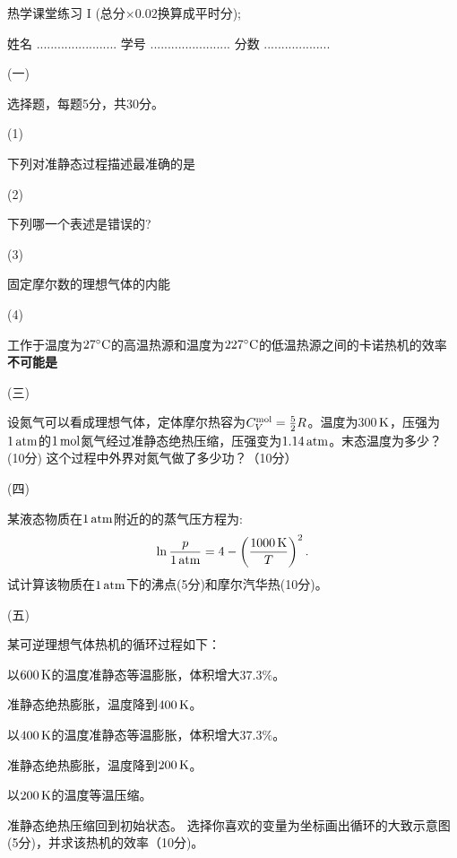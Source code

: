 \documentclass[12pt,CJK]{article}
\begin{document}
\bch
{\large 热学课堂练习 I (总分$\times 0.02$换算成平时分);}


姓名 ....................... {\hskip 0.5in}    学号 .......................{\hskip 0.5in}  分数 ...................



\item[(一)]{选择题，每题5分，共30分。

  \bitem
  \item[(1)]{
  下列对准静态过程描述最准确的是 \bropt


}

\item[(2)]{
  下列哪一个表述是错误的? \bropt
  

}


\item[(3)]{
  固定摩尔数的理想气体的内能 \bropt

  
}

\item[(4)]{
  工作于温度为$27^\circ \mathrm{C}$的高温热源和温度为$227^\circ \mathrm{C}$的低温热源之间的卡诺热机的效率{\bf 不可能是} \bropt

}
  \eitem
  }
\item[(三)]{设氮气可以看成理想气体，定体摩尔热容为$C_V^{\rm mol}=\frac{5}{2}R$。温度为300$\,\mathrm{K}$，压强为$1\,\mathrm{atm}$的$1\,\mathrm{mol}$氮气经过准静态绝热压缩，压强变为$1.14\,\mathrm{atm}$。末态温度为多少？(10分) 这个过程中外界对氮气做了多少功？（10分）

    \vspace{3.5in}


  }
\item[(四)]{某液态物质在$1\,\mathrm{atm}$附近的的蒸气压方程为: $$ \ln\frac{p}{1\,\mathrm{atm}} = 4 -\left(\frac{1000\,\mathrm{K}}{T}\right)^2.$$试计算该物质在$1\,\mathrm{atm}$下的沸点(5分)和摩尔汽华热(10分)。


    \vspace{2.3in}
  }

  \item[(五)]{某可逆理想气体热机的循环过程如下：
      \bitem
    \item{以$600\,\mathrm{K}$的温度准静态等温膨胀，体积增大$37.3\%$。}
    \item{准静态绝热膨胀，温度降到$400\,\mathrm{K}$。}
    \item{以$400\,\mathrm{K}$的温度准静态等温膨胀，体积增大$37.3\%$。}      
    \item{准静态绝热膨胀，温度降到$200\,\mathrm{K}$。}
    \item{以$200\,\mathrm{K}$的温度等温压缩。}
    \item{准静态绝热压缩回到初始状态。}            
      \eitem
      选择你喜欢的变量为坐标画出循环的大致示意图(5分)，并求该热机的效率（10分)。
    }
\eitem


\ech
\end{document}
